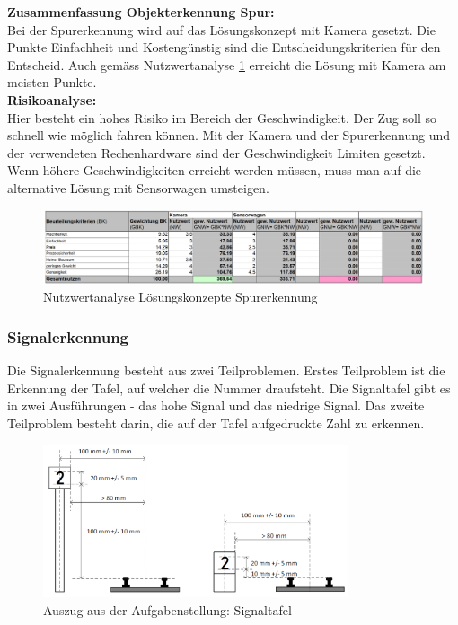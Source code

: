 \documentclass[../../main.tex]{subfiles}
\begin{document}
    \textbf{Zusammenfassung Objekterkennung Spur:}\\
    Bei der Spurerkennung wird auf das Lösungskonzept mit Kamera gesetzt. Die Punkte Einfachheit und Kostengünstig sind die Entscheidungskriterien für den Entscheid. Auch gemäss Nutzwertanalyse \ref{fig:nutzwer_spur} erreicht die Lösung mit Kamera am meisten Punkte.\\
    \textbf{Risikoanalyse:}\\
    Hier besteht ein hohes Risiko im Bereich der Geschwindigkeit. Der Zug soll so schnell wie möglich fahren können. Mit der Kamera und der Spurerkennung und der verwendeten Rechenhardware sind der Geschwindigkeit Limiten gesetzt. Wenn höhere Geschwindigkeiten erreicht werden müssen, muss man auf die alternative Lösung mit Sensorwagen umsteigen.\\

    \begin{figure}[H]
        \centering
        \includegraphics[width=1\textwidth]{Nutzwert_Spur.png}
        \caption{Nutzwertanalyse Lösungskonzepte Spurerkennung}
        \label{fig:nutzwer_spur}
    \end{figure}

    \subsubsection{Signalerkennung}
    Die Signalerkennung besteht aus zwei Teilproblemen. Erstes Teilproblem ist die Erkennung der Tafel, 
    auf welcher die Nummer draufsteht. Die Signaltafel gibt es in zwei Ausführungen - das hohe Signal und das 
    niedrige Signal. Das zweite Teilproblem besteht darin, die auf der Tafel aufgedruckte Zahl zu erkennen.\\

    \begin{figure}[H]
        \includegraphics[width=0.8\textwidth]{Signal.png}
        \caption{Auszug aus der Aufgabenstellung: Signaltafel}
    \end{figure}
\end{document}
